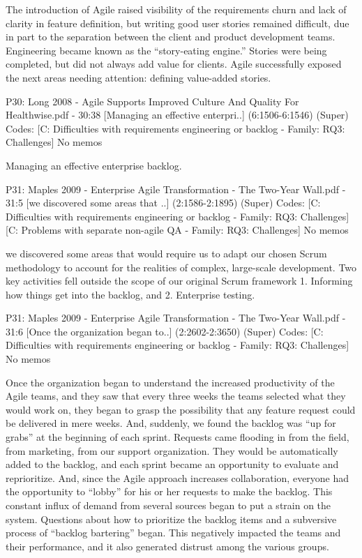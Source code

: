 \documentclass[preprint,authoryear,12pt]{elsarticle}
\begin{document}
The introduction of Agile raised visibility of the 
requirements churn and lack of clarity in feature 
definition, but writing good user stories remained 
difficult, due in part to the separation between the 
client and product development teams. 
Engineering became known as the “story-eating 
engine.” Stories were being completed, but did 
not always add value for clients.  
Agile successfully exposed the next areas needing 
attention: defining value-added stories.


P30: Long 2008 - Agile Supports Improved Culture And Quality For Healthwise.pdf - 30:38 [Managing an effective enterpri..]  (6:1506-6:1546)   (Super)
Codes:	[C: Difficulties with requirements engineering or backlog - Family: RQ3: Challenges] 
No memos

Managing an effective enterprise backlog.


P31: Maples 2009 - Enterprise Agile Transformation - The Two-Year Wall.pdf - 31:5 [we discovered some areas that ..]  (2:1586-2:1895)   (Super)
Codes:	[C: Difficulties with requirements engineering or backlog - Family: RQ3: Challenges] [C: Problems with separate non-agile QA - Family: RQ3: Challenges] 
No memos

we discovered some areas that 
would require us to adapt our chosen Scrum 
methodology to account for the realities of complex, 
large-scale development.  Two key activities fell 
outside the scope of our original Scrum framework 1. 
Informing how things get into the backlog, and 2. 
Enterprise testing.


P31: Maples 2009 - Enterprise Agile Transformation - The Two-Year Wall.pdf - 31:6 [Once the organization began to..]  (2:2602-2:3650)   (Super)
Codes:	[C: Difficulties with requirements engineering or backlog - Family: RQ3: Challenges] 
No memos

Once the organization began to understand the 
increased productivity of the Agile teams, and they saw 
that every three weeks the teams selected what they 
would work on, they began to grasp the possibility that 
any feature request could be delivered in mere weeks.  
And, suddenly, we found the backlog was “up for 
grabs” at the beginning of each sprint. 
Requests came flooding in from the field, from 
marketing, from our support organization. They would 
be automatically added to the backlog, and each sprint 
became an opportunity to evaluate and reprioritize. 
And, since the Agile approach increases collaboration, 
everyone had the opportunity to “lobby” for his or her 
requests to make the backlog. This constant influx of 
demand from several sources began to put a strain on 
the system.  Questions about how to prioritize the 
backlog items and a subversive process of “backlog 
bartering” began. This negatively impacted the teams 
and their performance, and it also generated distrust 
among the various groups.
\end{document}
